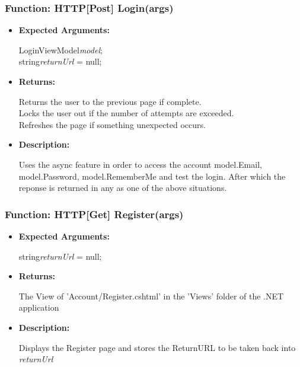 \documentclass{scrreprt}
\begin{document}
\subsubsection{Function: HTTP[Post] Login(args)}
\begin{itemize}
    \item \textbf{Expected Arguments:}

    LoginViewModel\quad\textit{model};
    \\
    string\quad\textit{returnUrl} = null;

    \item \textbf{Returns:}

    Returns the user to the previous page if complete.
    \\
    Locks the user out if the number of attempts are exceeded.
    \\
    Refreshes the page if something unexpected occurs.

    \item \textbf{Description:}

    Uses the async feature in order to access the account model.Email, model.Password, model.RememberMe and test the login. After which the reponse is returned in any as one of the above situations.

\end{itemize}


\subsubsection{Function: HTTP[Get] Register(args)}
\begin{itemize}
    \item \textbf{Expected Arguments:}

    string\quad\textit{returnUrl} = null;

    \item \textbf{Returns:}

    The View of 'Account/Register.cshtml' in the 'Views' folder of the .NET application

    \item \textbf{Description:}

    Displays the Register page and stores the ReturnURL to be taken back into \textit{returnUrl}
\end{itemize}
\end{document}
